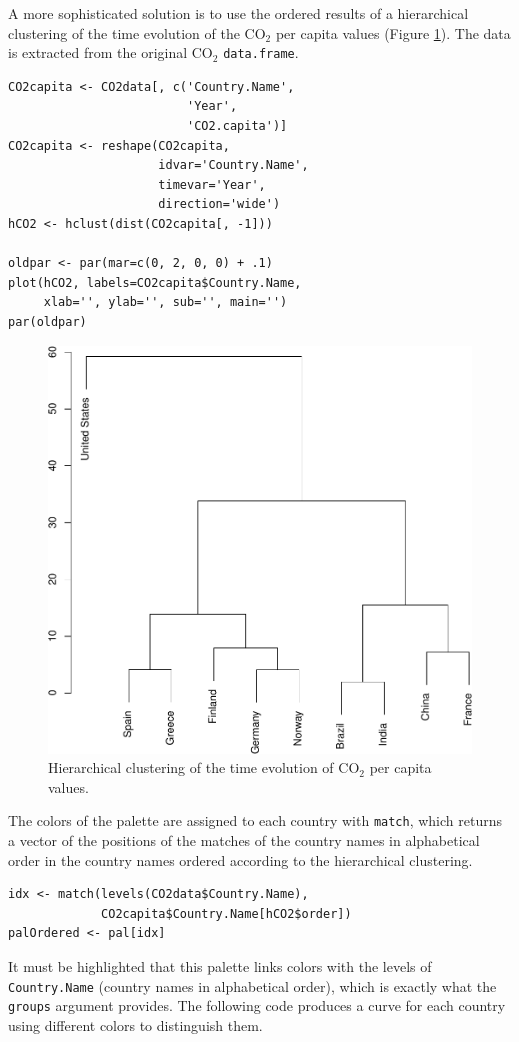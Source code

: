 \documentclass[smallroyalvopaper]{memoir}
\begin{document}
A more sophisticated solution is to use the ordered results of a
hierarchical clustering of the time evolution of the \(\mathrm{CO_2}\) per capita
values (Figure \ref{fig:hclustCO2}). The data is extracted from the
original \(\mathrm{CO_2}\) \texttt{data.frame}.  


\lstset{language=r,label= ,caption= ,captionpos=b,numbers=none}
\begin{lstlisting}
CO2capita <- CO2data[, c('Country.Name',
                         'Year',
                         'CO2.capita')]
CO2capita <- reshape(CO2capita,
                     idvar='Country.Name',
                     timevar='Year',
                     direction='wide')
hCO2 <- hclust(dist(CO2capita[, -1]))

oldpar <- par(mar=c(0, 2, 0, 0) + .1)
plot(hCO2, labels=CO2capita$Country.Name,
     xlab='', ylab='', sub='', main='')
par(oldpar)
\end{lstlisting}

\begin{figure}[htbp]
\centering
\includegraphics[width=.9\linewidth]{figs/hclust.pdf}
\caption{Hierarchical clustering of the time evolution of \(\mathrm{CO_2}\) per capita values. \label{fig:hclustCO2}}
\end{figure}


The colors of the palette are assigned to each country with \texttt{match},
which returns a vector of the positions of the matches of the country
names in alphabetical order in the country names ordered according to
the hierarchical clustering.
\lstset{language=r,label= ,caption= ,captionpos=b,numbers=none}
\begin{lstlisting}
idx <- match(levels(CO2data$Country.Name), 
             CO2capita$Country.Name[hCO2$order])
palOrdered <- pal[idx]  
\end{lstlisting}
It must be highlighted that this palette links colors with the levels
of \texttt{Country.Name} (country names in alphabetical order), which is
exactly what the \texttt{groups} argument provides. The following code
produces a curve for each country using different colors to
distinguish them.
\end{document}
